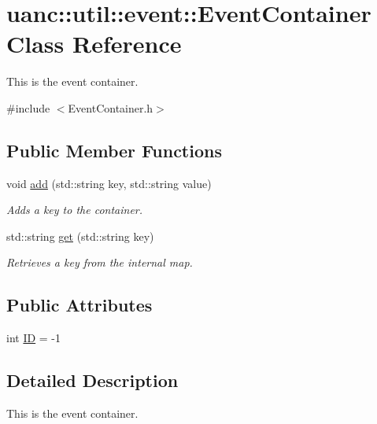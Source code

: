 \hypertarget{classuanc_1_1util_1_1event_1_1_event_container}{}\section{uanc\+:\+:util\+:\+:event\+:\+:Event\+Container Class Reference}
\label{classuanc_1_1util_1_1event_1_1_event_container}


This is the event container.  




{\ttfamily \#include $<$Event\+Container.\+h$>$}

\subsection*{Public Member Functions}
\begin{DoxyCompactItemize}
\item 
void \hyperlink{classuanc_1_1util_1_1event_1_1_event_container_ac53f74b44d89a492b0ae55b585a0157d}{add} (std\+::string key, std\+::string value)
\begin{DoxyCompactList}\small\item\em Adds a key to the container. \end{DoxyCompactList}\item 
std\+::string \hyperlink{classuanc_1_1util_1_1event_1_1_event_container_a753a768f9df814994501cb398b8048c7}{get} (std\+::string key)
\begin{DoxyCompactList}\small\item\em Retrieves a key from the internal map. \end{DoxyCompactList}\end{DoxyCompactItemize}
\subsection*{Public Attributes}
\begin{DoxyCompactItemize}
\item 
int \hyperlink{classuanc_1_1util_1_1event_1_1_event_container_a27f819d0a217a8887c884cf2c69da4b7}{ID} = -\/1
\end{DoxyCompactItemize}


\subsection{Detailed Description}
This is the event container. 

